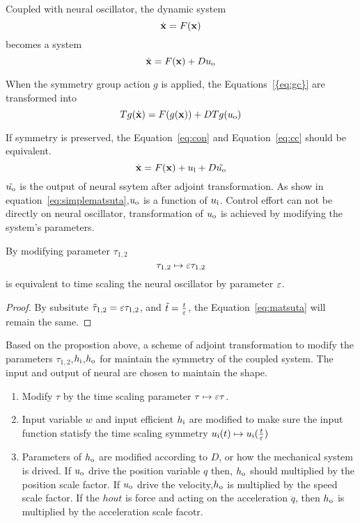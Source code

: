 Coupled with neural oscillator, the dynamic system 
\[
\dot{\mathbf{x}}=F(\mathbf{x})
\]
becomes a system 
\begin{equation}
\label{eq:gc}
\dot{\mathbf{x}}=F(\mathbf{x})+Du_{\mathrm{o}}
\end{equation}


When the symmetry group action $g$ is applied, the Equations~\ref{{eq:gc}} are transformed into
\begin{equation}
\label{eq:cc}
Tg(\dot{\mathbf{x}})=F(g(\mathbf{x}))+DTg(u_{\mathrm{o}})
\end{equation}




If symmetry is preserved, the Equation~\ref{eq:con} and Equation~\ref{eq:cc} should be equivalent.
\begin{equation}
\label{eq:con}
\dot{\mathbf{x}}=F(\mathbf{x})+u_{\mathrm{l}}+D\tilde{u_{\mathrm{o}}}
\end{equation}
$\tilde{u_{\mathrm{o}}}$ is the output of neural ssytem after adjoint transformation.
As show in equation~\ref{eq:simplematsuta},$u_{\mathrm{o}}$ is a function of $u_{\mathrm{i}}$.
Control effort can not be directly on neural oscillator, transformation of $u_{\mathrm{o}}$ is achieved by modifying the system's parameters.



\begin{myprop}
By modifying parameter $\tau_{1,2}$
\[
\tau_{1,2} \mapsto \varepsilon \tau_{1,2}
\]
is equivalent to time scaling the neural oscillator by parameter $\varepsilon$.
\end{myprop}
\begin{proof}
By subsitute $\tilde{\tau}_{1,2}=\varepsilon \tau_{1,2}$, and $\tilde{t}=\frac{t}{\varepsilon}$, the Equation~\ref{eq:matsuta} will remain the same.
\end{proof}

Based on the propostion above, a scheme of adjoint transformation to modify the parameters $\tau_{1,2}$,$h_{\mathrm{i}}$,$h_{\mathrm{o}}$ for maintain the symmetry of the  coupled system.
The input and output of neural are chosen to maintain the shape.
\begin{enumerate}
\item Modify $\tau$ by the time scaling parameter $\tau \mapsto \varepsilon \tau$.
\item Input variable $w$ and input efficient $h_{\mathrm{i}}$ are modified to make sure the input function statisfy the time scaling symmetry $u_{\mathrm{i}}(t) \mapsto u_{\mathrm{i}}(\frac{t}{\varepsilon})$
\item  Parameters of $h_{\mathrm{o}}$ are modified according to $D$, or how the mechanical system is drived.
If $u_{\mathrm{o}}$ drive the position variable $q$ then, $h_{\mathrm{o}}$ should multiplied by the position scale factor. 
If $u_{\mathrm{o}}$ drive the velocity,$h_{\mathrm{o}}$ is multiplied by the speed scale factor.
If the $hout$ is force and acting on the acceleration $\ddot{q}$, then $h_{\mathrm{o}}$ is multiplied by the acceleration scale facotr.
\end{enumerate}


